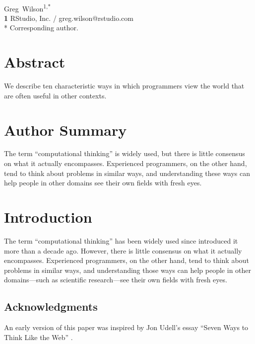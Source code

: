 \documentclass[10pt,letterpaper]{article}
\begin{document}
\vspace*{0.2in}

\begin{flushleft}
{\Large
\textbf{}
}
\newline
\\
{Greg~Wilson}\textsuperscript{1,*}
\\
\textbf{1} RStudio, Inc. / greg.wilson@rstudio.com
\\
\bigskip
* Corresponding author.
\end{flushleft}

\section*{Abstract}

We describe ten characteristic ways in which programmers view the world that are
often useful in other contexts.

\section*{Author Summary}

The term ``computational thinking'' is widely used, but there is little
consensus on what it actually encompasses.  Experienced programmers, on the
other hand, tend to think about problems in similar ways, and understanding
these ways can help people in other domains see their own fields with fresh
eyes.

\section*{Introduction}

The term ``computational thinking'' has been widely used since \cite{Wing2006}
introduced it more than a decade ago.  However, there is little consensus on
what it actually encompasses.  Experienced programmers, on the other hand,
tend to think about problems in similar ways, and understanding those ways
can help people in other domains---such as scientific research---see their
own fields with fresh eyes.

\subsection*{Acknowledgments}

An early version of this paper was inspired by Jon Udell's essay ``Seven Ways to
Think Like the Web'' \cite{Udel2011}.
\end{document}
